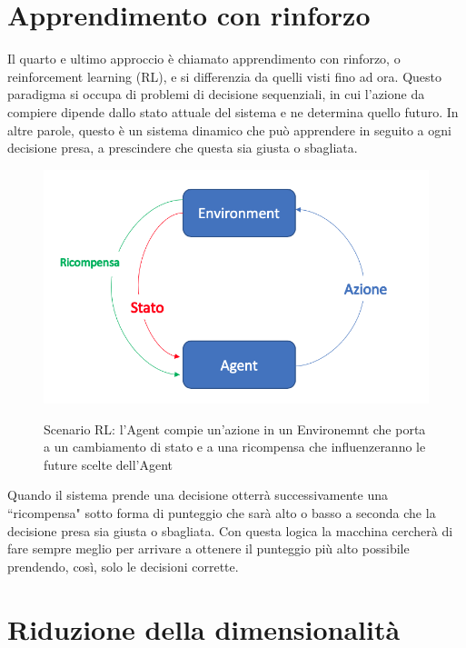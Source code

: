 \documentclass[12pt,italian]{report}
\begin{document}
\section{Apprendimento con rinforzo}
Il quarto e ultimo approccio è chiamato apprendimento con rinforzo, o reinforcement learning (RL), e si differenzia da quelli visti fino ad ora. Questo paradigma si occupa di problemi di decisione sequenziali, in cui l'azione da compiere dipende dallo stato attuale del sistema e ne determina quello futuro. In altre parole, questo è un sistema dinamico che può apprendere in seguito a ogni decisione presa, a prescindere che questa sia giusta o sbagliata.

\begin{figure}[h!]
	\noindent
	\center
	\label{fig:rl_scenario}
	\includegraphics[scale=0.35]{../img/rl_scenario}
	\caption{Scenario RL: l'Agent compie un'azione in un Environemnt che porta a un cambiamento di stato e a una ricompensa che influenzeranno le future scelte dell'Agent}
\end{figure}


Quando il sistema prende una decisione otterrà successivamente una ``ricompensa" sotto forma di punteggio che sarà alto o basso a seconda che la decisione presa sia giusta o sbagliata. Con questa logica la macchina cercherà di fare sempre meglio per arrivare a ottenere il punteggio più alto possibile prendendo, così, solo le decisioni corrette. 

\section{Riduzione della dimensionalità}
\end{document}
